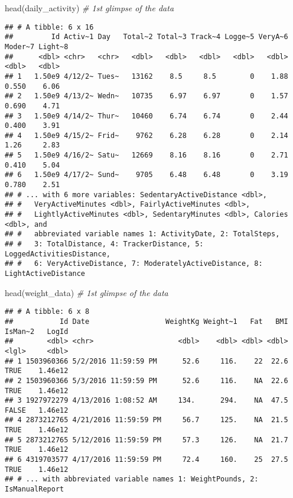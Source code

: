 \documentclass[
]{article}
\newenvironment{Shaded}{\begin{snugshade}}{\end{snugshade}}
\newcommand{\CommentTok}[1]{\textcolor[rgb]{0.56,0.35,0.01}{\textit{#1}}}
\newcommand{\FunctionTok}[1]{\textcolor[rgb]{0.00,0.00,0.00}{#1}}
\newcommand{\NormalTok}[1]{#1}
\begin{document}
\begin{Shaded}
\begin{Highlighting}[]
     \FunctionTok{head}\NormalTok{(daily\_activity) }\CommentTok{\# 1st glimpse of the data}
\end{Highlighting}
\end{Shaded}

\begin{verbatim}
## # A tibble: 6 x 16
##         Id Activ~1 Day   Total~2 Total~3 Track~4 Logge~5 VeryA~6 Moder~7 Light~8
##      <dbl> <chr>   <chr>   <dbl>   <dbl>   <dbl>   <dbl>   <dbl>   <dbl>   <dbl>
## 1   1.50e9 4/12/2~ Tues~   13162    8.5     8.5        0    1.88   0.550    6.06
## 2   1.50e9 4/13/2~ Wedn~   10735    6.97    6.97       0    1.57   0.690    4.71
## 3   1.50e9 4/14/2~ Thur~   10460    6.74    6.74       0    2.44   0.400    3.91
## 4   1.50e9 4/15/2~ Frid~    9762    6.28    6.28       0    2.14   1.26     2.83
## 5   1.50e9 4/16/2~ Satu~   12669    8.16    8.16       0    2.71   0.410    5.04
## 6   1.50e9 4/17/2~ Sund~    9705    6.48    6.48       0    3.19   0.780    2.51
## # ... with 6 more variables: SedentaryActiveDistance <dbl>,
## #   VeryActiveMinutes <dbl>, FairlyActiveMinutes <dbl>,
## #   LightlyActiveMinutes <dbl>, SedentaryMinutes <dbl>, Calories <dbl>, and
## #   abbreviated variable names 1: ActivityDate, 2: TotalSteps,
## #   3: TotalDistance, 4: TrackerDistance, 5: LoggedActivitiesDistance,
## #   6: VeryActiveDistance, 7: ModeratelyActiveDistance, 8: LightActiveDistance
\end{verbatim}

\begin{Shaded}
\begin{Highlighting}[]
     \FunctionTok{head}\NormalTok{(weight\_data) }\CommentTok{\# 1st glimpse of the data}
\end{Highlighting}
\end{Shaded}

\begin{verbatim}
## # A tibble: 6 x 8
##           Id Date                  WeightKg Weight~1   Fat   BMI IsMan~2   LogId
##        <dbl> <chr>                    <dbl>    <dbl> <dbl> <dbl> <lgl>     <dbl>
## 1 1503960366 5/2/2016 11:59:59 PM      52.6     116.    22  22.6 TRUE    1.46e12
## 2 1503960366 5/3/2016 11:59:59 PM      52.6     116.    NA  22.6 TRUE    1.46e12
## 3 1927972279 4/13/2016 1:08:52 AM     134.      294.    NA  47.5 FALSE   1.46e12
## 4 2873212765 4/21/2016 11:59:59 PM     56.7     125.    NA  21.5 TRUE    1.46e12
## 5 2873212765 5/12/2016 11:59:59 PM     57.3     126.    NA  21.7 TRUE    1.46e12
## 6 4319703577 4/17/2016 11:59:59 PM     72.4     160.    25  27.5 TRUE    1.46e12
## # ... with abbreviated variable names 1: WeightPounds, 2: IsManualReport
\end{verbatim}
\end{document}
